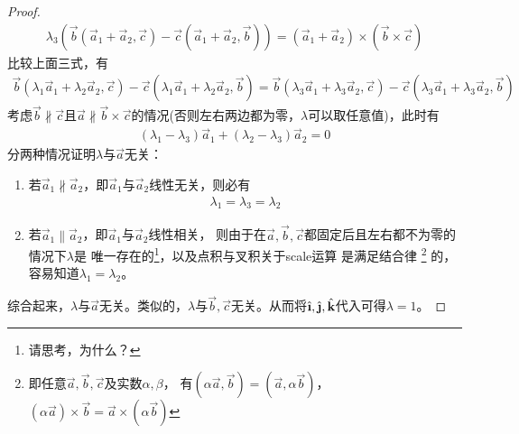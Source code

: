\begin{proof}
\begin{align*}
    \lambda_3(\vec b(\vec a_1 + \vec a_2,\vec c) - \vec c(\vec a_1 + \vec a_2, \vec b)) = (\vec a_1 + \vec a_2)\times(\vec b\times\vec c)
  \end{align*}
  比较上面三式，有
  \begin{align*}
    \vec b(\lambda_1\vec a_1 + \lambda_2\vec a_2, \vec c) - \vec c(\lambda_1 \vec a_1 + \lambda_2\vec a_2, \vec b)
    =\vec b(\lambda_3\vec a_1 + \lambda_3\vec a_2, \vec c) - \vec c(\lambda_3 \vec a_1 + \lambda_3\vec a_2, \vec b)
  \end{align*}
  考虑$\vec b\not\parallel\vec c$且$\vec a\not\parallel\vec b\times\vec c$的情况(否则左右两边都为零，$\lambda$可以取任意值)，此时有
  \begin{align*}
    (\lambda_1 - \lambda_3)\vec a_1 + (\lambda_2 - \lambda_3)\vec a_2 = 0
  \end{align*}
  分两种情况证明$\lambda$与$\vec a$无关：
  \begin{enumerate}
  \item 若$\vec a_1\not\parallel \vec a_2$，即$\vec a_1$与$\vec a_2$线性无关，则必有
    \begin{align*}
      \lambda_1 = \lambda_3 = \lambda_2
    \end{align*}
  \item 若$\vec a_1\parallel \vec a_2$，即$\vec a_1$与$\vec a_2$线性相关，
    则由于在$\vec a,\vec b,\vec c$都固定后且左右都不为零的情况下$\lambda$是
    唯一存在的\footnote{请思考，为什么？}，以及点积与叉积关于scale运算
    是满足结合律
    \footnote{即任意$\vec a,\vec b,\vec c$及实数$\alpha,\beta$，
      有$(\alpha\vec a,\vec b)=(\vec a,\alpha\vec b)$，
      $(\alpha\vec a)\times\vec b=\vec a\times(\alpha\vec b)$
    }
    的，容易知道$\lambda_1=\lambda_2$。
  \end{enumerate}

  综合起来，$\lambda$与$\vec a$无关。类似的，$\lambda$与$\vec b,\vec c$无关。从而将$\ihat, \jhat, \khat$代入可得$\lambda=1$。
  



\end{proof}

